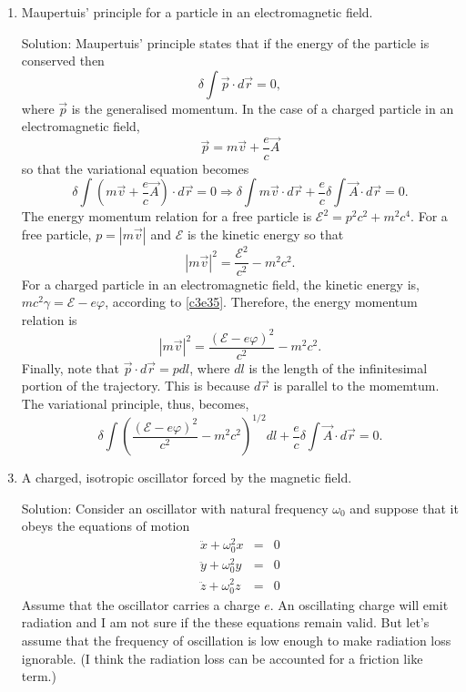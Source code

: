 \begin{enumerate}
\item Maupertuis' principle for a particle in an electromagnetic field.
\item[Solution:] Maupertuis' principle states that if the energy of the 
particle is conserved then 
\[
\delta\int\vec{p}\cdot d\vec{r} = 0,
\]
where $\vec{p}$ is the generalised momentum. In the case of a charged particle 
in an electromagnetic field,
\[
\vec{p} = m\vec{v} + \frac{e}{c}\vec{A}
\]
so that the variational equation becomes
\[
\delta\int\left(m\vec{v} + \frac{e}{c}\vec{A}\right)\cdot d\vec{r} = 0 
\Rightarrow
\delta\int m\vec{v}\cdot d\vec{r} + \frac{e}{c}\delta\int\vec{A}\cdot d\vec{r} 
= 0.
\]
The energy momentum relation for a free particle is $\mathcal{E}^2 = p^2c^2 + 
m^2c^4$. For a free particle, $p = |m\vec{v}|$ and $\mathcal{E}$ is the kinetic
energy so that
\[
|m\vec{v}|^2 = \frac{\mathcal{E}^2}{c^2} - m^2c^2.
\]
For a charged particle in an electromagnetic field, the kinetic energy is, $mc^2
\gamma = \mathcal{E} - e\varphi$, according to \eqref{c3e35}. Therefore, the 
energy momentum relation is
\[
|m\vec{v}|^2 = \frac{(\mathcal{E} - e\varphi)^2}{c^2} - m^2c^2.
\]
Finally, note that $\vec{p}\cdot d\vec{r} = pdl$, where $dl$ is the length of 
the infinitesimal portion of the trajectory. This is because $d\vec{r}$ is 
parallel to the momemtum. The variational principle, thus, becomes,
\[
\delta\int 
\left(\frac{(\mathcal{E} - e\varphi)^2}{c^2} - m^2c^2\right)^{1/2}dl + 
\frac{e}{c}\delta\int\vec{A}\cdot d\vec{r} = 0.
\]

\item A charged, isotropic oscillator forced by the magnetic field.
\item[Solution:] Consider an oscillator with natural frequency $\omega_0$ and 
suppose that it obeys the equations of motion
\begin{eqnarray*}
\ddot{x} + \omega_0^2 x &=& 0 \\
\ddot{y} + \omega_0^2 y &=& 0 \\
\ddot{z} + \omega_0^2 z &=& 0
\end{eqnarray*}
Assume that the oscillator carries a charge $e$. An oscillating charge will emit
radiation and I am not sure if the these equations remain valid. But let's 
assume that the frequency of oscillation is low enough to make radiation loss 
ignorable. (I think the radiation loss can be accounted for a friction like 
term.)


\end{enumerate}
